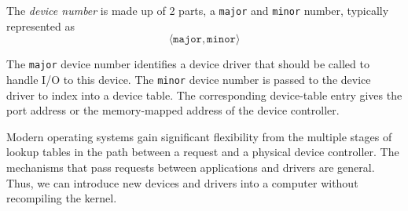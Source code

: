 \begin{definition}\label{def:Device_Number}
  The \emph{device number} is made up of 2 parts, a \texttt{major} and \texttt{minor} number, typically represented as
  \begin{equation*}
    \langle \mathtt{major}, \mathtt{minor} \rangle
  \end{equation*}

  The \texttt{major} device number identifies a device driver that should be called to handle I/O to this device.
  The \texttt{minor} device number  is passed to the device driver to index into a device table.
  The corresponding device-table entry gives the port address or the memory-mapped address of the device controller.
\end{definition}

Modern operating systems gain significant flexibility from the multiple stages of lookup tables in the path between a request and a physical device controller.
The mechanisms that pass requests between applications and drivers are general.
Thus, we can introduce new devices and drivers into a computer without recompiling the kernel.


